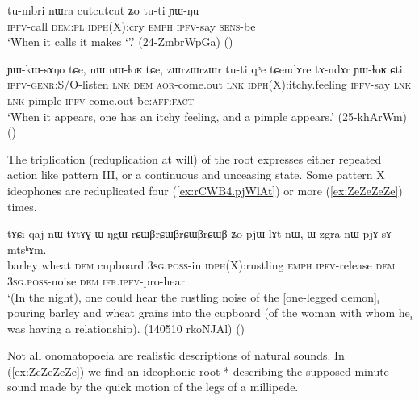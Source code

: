 \begin{exe}
\ex \label{ex:cutcutcut}
\gll    tu-mbri nɯra cutcutcut ʑo tu-ti ɲɯ-ŋu  \\
  \textsc{ipfv}-call \textsc{dem}:\textsc{pl} \textsc{idph}(X):cry \textsc{emph} \textsc{ipfv}-say \textsc{sens}-be \\
\glt  `When it calls it makes `'.' (24-ZmbrWpGa) 	()
\end{exe}

\begin{exe}
\ex \label{ex:zWrzWrzWr}
\gll ɲɯ-kɯ-sɤŋo tɕe, nɯ nɯ-ɬoʁ tɕe, zɯrzɯrzɯr tu-ti qʰe tɕendɤre tɤ-ndɤr ɲɯ-ɬoʁ ɕti.	\\
\textsc{ipfv}-\textsc{genr}:S/O-listen \textsc{lnk} \textsc{dem} \textsc{aor}-come.out \textsc{lnk} \textsc{idph}(X):itchy.feeling \textsc{ipfv}-say \textsc{lnk}  \textsc{lnk} pimple \textsc{ipfv}-come.out be:\textsc{aff}:\textsc{fact} \\
\glt `When it appears, one has an itchy feeling, and a pimple appears.' (25-khArWm) 	()
\end{exe}

The triplication (reduplication at will) of the root expresses either repeated action like pattern III, or a continuous and unceasing state. Some pattern X ideophones are reduplicated four (\ref{ex:rCWB4.pjWlAt}) or more (\ref{ex:ZeZeZeZe}) times. 

\begin{exe}
\ex \label{ex:rCWB4.pjWlAt}
\gll tɤɕi qaj nɯ tɤtɤɣ ɯ-ŋgɯ rɕɯβrɕɯβrɕɯβrɕɯβ ʑo pjɯ-lɤt nɯ, ɯ-zgra nɯ pjɤ-sɤ-mtsʰɤm.  \\
barley wheat \textsc{dem} cupboard \textsc{3sg}.\textsc{poss}-in \textsc{idph}(X):rustling \textsc{emph} \textsc{ipfv}-release \textsc{dem} \textsc{3sg}.\textsc{poss}-noise \textsc{dem} \textsc{ifr}.\textsc{ipfv}-pro-hear \\
\glt `(In the night), one could hear the rustling noise of the [one-legged demon]$_i$ pouring barley and wheat grains into the cupboard (of the woman with whom he$_i$ was having a relationship). (140510 rkoNJAl) ()
\end{exe}

Not all onomatopoeia are realistic descriptions of natural sounds. In (\ref{ex:ZeZeZeZe}) we find an ideophonic root * describing the supposed minute sound made by the quick motion of the legs of a millipede.

